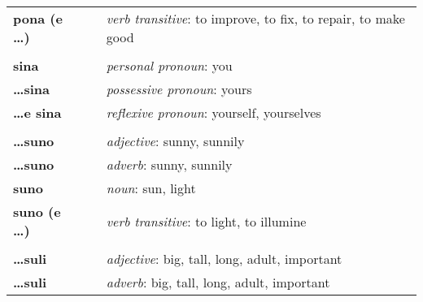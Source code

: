 \begin{supertabular}{p{2,5cm}|ll}
    \textbf{pona (e \dots)} &  & \textit{verb transitive}: to improve, to fix, to repair, to make good                                   \\ %
                            &  &                                                                                                         \\ %
    \textbf{sina}           &  & \textit{personal pronoun}: you                                                                          \\ %
    \textbf{\dots sina}     &  & \textit{possessive pronoun}: yours                                                                      \\  %
    \textbf{\dots e sina}   &  & \textit{reflexive pronoun}: yourself, yourselves                                                        \\
                            &  &                                                                                                         \\ %
    \textbf{\dots suno}     &  & \textit{adjective}: sunny, sunnily                                                                      \\ %
    \textbf{\dots suno}     &  & \textit{adverb}: sunny, sunnily                                                                         \\ %
    \textbf{suno}           &  & \textit{noun}: sun, light                                                                               \\ %
    \textbf{suno (e \dots)} &  & \textit{verb transitive}: to light, to illumine                                                         \\ %
                            &  &                                                                                                         \\ %
    \textbf{\dots suli}     &  & \textit{adjective}: big, tall, long, adult, important                                                   \\ %
    \textbf{\dots suli}     &  & \textit{adverb}: big, tall, long, adult, important                                                      \\ %

\end{supertabular}
